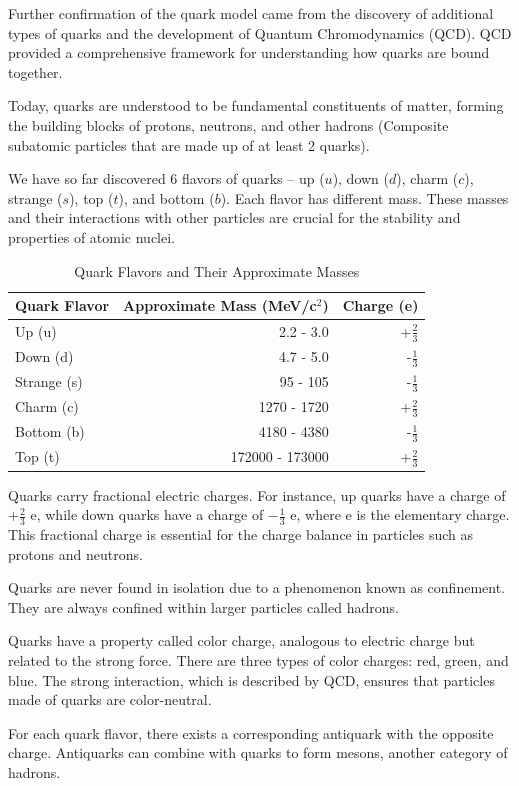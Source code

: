 Further confirmation of the quark model came from the discovery of additional types of quarks and the development of Quantum Chromodynamics (QCD).
QCD provided a comprehensive framework for understanding how quarks are bound together.

Today, quarks are understood to be fundamental constituents of matter, forming the building blocks of protons, neutrons, and other hadrons (Composite subatomic particles that are made up of at least 2 quarks).

We have so far discovered 6 flavors of quarks -- up (\(u\)), down (\(d\)), charm (\(c\)), strange (\(s\)), top (\(t\)), and bottom (\(b\)).
Each flavor has different mass.
These masses and their interactions with other particles are crucial for the stability and properties of atomic nuclei.

\begin{table}[h!]
  \centering
  \begin{tabular}{lrr}
    \toprule
    Quark Flavor & Approximate Mass (MeV/c\(^2\)) & Charge (e) \\
    \midrule
    Up (u)      & 2.2 - 3.0        & +\(\frac{2}{3}\) \\
    Down (d)    & 4.7 - 5.0        & -\(\frac{1}{3}\) \\
    Strange (s) & 95 - 105         & -\(\frac{1}{3}\) \\
    Charm (c)   & 1270 - 1720      & +\(\frac{2}{3}\) \\
    Bottom (b)  & 4180 - 4380      & -\(\frac{1}{3}\) \\
    Top (t)     & 172000 - 173000  & +\(\frac{2}{3}\) \\
    \bottomrule
  \end{tabular}
  \caption{Quark Flavors and Their Approximate Masses}
  \label{quarkMass}
\end{table}

Quarks carry fractional electric charges.
For instance, up quarks have a charge of \(+\frac{2}{3}\) e, while down quarks have a charge of \(-\frac{1}{3}\) e, where e is the elementary charge.
This fractional charge is essential for the charge balance in particles such as protons and neutrons.

Quarks are never found in isolation due to a phenomenon known as confinement.
They are always confined within larger particles called hadrons.

Quarks have a property called color charge, analogous to electric charge but related to the strong force.
There are three types of color charges: red, green, and blue.
The strong interaction, which is described by QCD, ensures that particles made of quarks are color-neutral.

For each quark flavor, there exists a corresponding antiquark with the opposite charge.
Antiquarks can combine with quarks to form mesons, another category of hadrons.

